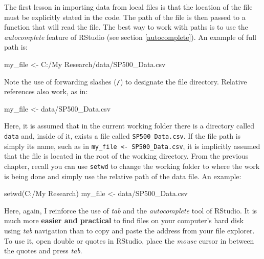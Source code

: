 \documentclass[
  12pt,
]{book}
\newenvironment{Shaded}{\begin{snugshade}}{\end{snugshade}}
\newcommand{\FunctionTok}[1]{\textcolor[rgb]{0,0,0}{#1}}
\newcommand{\NormalTok}[1]{#1}
\newcommand{\OtherTok}[1]{\textcolor[rgb]{0.37,0.37,0.37}{#1}}
\newcommand{\StringTok}[1]{\textcolor[rgb]{0.5,0.5,0.5}{#1}}
\newenvironment{rmdimportant}
{\begin{importantblock}
		
	} {\end{importantblock}}
\begin{document}
The first lesson in importing data from local files is that the location of the file must be explicitly stated in the code. The path of the file is then passed to a function that will read the file. The best way to work with paths is to use the \emph{autocomplete} feature of RStudio (see section \ref{autocomplete}). An example of full path is:

\begin{Shaded}
\begin{Highlighting}[]
\NormalTok{my\_file }\OtherTok{\textless{}{-}} \StringTok{\textquotesingle{}C:/My Research/data/SP500\_Data.csv\textquotesingle{}}
\end{Highlighting}
\end{Shaded}

Note the use of forwarding slashes (\texttt{/}) to designate the file directory. Relative references also work, as in:

\begin{Shaded}
\begin{Highlighting}[]
\NormalTok{my\_file }\OtherTok{\textless{}{-}} \StringTok{\textquotesingle{}data/SP500\_Data.csv\textquotesingle{}}
\end{Highlighting}
\end{Shaded}

Here, it is assumed that in the current working folder there is a directory called \texttt{data} and, inside of it, exists a file called \texttt{SP500\_Data.csv}. If the file path is simply its name, such as in \texttt{my\_file\ \textless{}-\ \textquotesingle{}SP500\_Data.csv\textquotesingle{}}, it is implicitly assumed that the file is located in the root of the working directory. From the previous chapter, recall you can use \texttt{setwd} to change the working folder to where the work is being done and simply use the relative path of the data file. An example:

\begin{Shaded}
\begin{Highlighting}[]
\FunctionTok{setwd}\NormalTok{(}\StringTok{\textquotesingle{}C:/My Research\textquotesingle{}}\NormalTok{)}
\NormalTok{my\_file }\OtherTok{\textless{}{-}} \StringTok{\textquotesingle{}data/SP500\_Data.csv\textquotesingle{}}
\end{Highlighting}
\end{Shaded}

\begin{rmdimportant}
Here, again, I reinforce the use of \emph{tab} and the
\emph{autocomplete} tool of RStudio. It is much more \textbf{easier and
practical} to find files on your computer's hard disk using \emph{tab}
navigation than to copy and paste the address from your file explorer.
To use it, open double or quotes in RStudio, place the \emph{mouse}
cursor in between the quotes and press \emph{tab}.
\end{rmdimportant}
\end{document}

